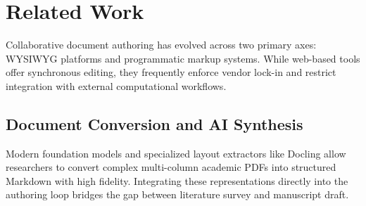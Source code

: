 \section{Related Work}
\label{sec:related_work}

Collaborative document authoring has evolved across two primary axes: WYSIWYG platforms and programmatic markup systems. While web-based tools offer synchronous editing, they frequently enforce vendor lock-in and restrict integration with external computational workflows.

\subsection{Document Conversion and AI Synthesis}
Modern foundation models \cite{Vaswani2017Attention} and specialized layout extractors like Docling \cite{Docling2024IBM} allow researchers to convert complex multi-column academic PDFs into structured Markdown with high fidelity. Integrating these representations directly into the authoring loop bridges the gap between literature survey and manuscript draft.
